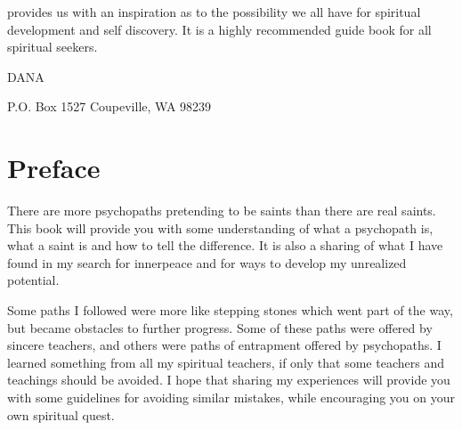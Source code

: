 \documentclass[a5paper,10pt,english]{book}
\begin{document}
\sphinxAtStartPar
{} provides us with an inspiration as to the possibility we all have for spiritual development and self discovery. It is a highly recommended guide book for all spiritual seekers.

\begin{figure}[htbp]
\centering

\noindent{}
\end{figure}

\sphinxAtStartPar
{}

\sphinxAtStartPar
{}

\begin{DUlineblock}{0em}
\item[] DANA
\item[] P.O. Box 1527 Coupeville, WA 98239
\end{DUlineblock}

\sphinxAtStartPar
{}

\sphinxstepscope


\chapter{Preface}
\label{\detokenize{preface:preface}}\label{\detokenize{preface::doc}}
\setcounter{section}{0}

\sphinxAtStartPar
There are more psychopaths pretending to be saints than there are real
saints. This book will provide you with some understanding of what a
psychopath is, what a saint is and how to tell the difference. It is
also a sharing of what I have found in my search for inner\sphinxhyphen{}peace and for
ways to develop my unrealized potential.

\sphinxAtStartPar
Some paths I followed were more like stepping stones which went part of
the way, but became obstacles to further progress. Some of these paths
were offered by sincere teachers, and others were paths of entrapment
offered by psychopaths. I learned something from all my spiritual
teachers, if only that some teachers and teachings should be avoided. I
hope that sharing my experiences will provide you with some guidelines
for avoiding similar mistakes, while encouraging you on your own
spiritual quest.
\end{document}
